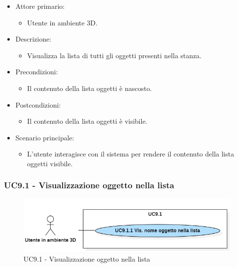 \begin{itemize}

	\item Attore primario: 
	\begin{itemize}
		\item Utente in ambiente 3D.
	\end{itemize}
	\item Descrizione:
	\begin{itemize}
		\item Visualizza la lista di tutti gli oggetti presenti nella stanza.
	\end{itemize}
	
	\item Precondizioni:
	\begin{itemize}
		\item Il contenuto della lista oggetti è nascosto.
	\end{itemize}
	
	\item Postcondizioni:
	\begin{itemize}
		\item Il contenuto della lista oggetti è visibile.
	\end{itemize}
	
	\item Scenario principale:
	\begin{itemize}
		\item L'utente interagisce con il sistema per rendere il contenuto della lista oggetti visibile.
	\end{itemize}
	
\end{itemize}


\subsubsection{UC9.1 - Visualizzazione oggetto nella lista}

\begin{figure}[H]
  \renewcommand{\thefigure}{10}
  \includegraphics[width=\linewidth]{./res/images/UC9.1.png}
  \caption{UC9.1 - Visualizzazione oggetto nella lista}
  \label{fig:UC 9.1}
\end{figure}


